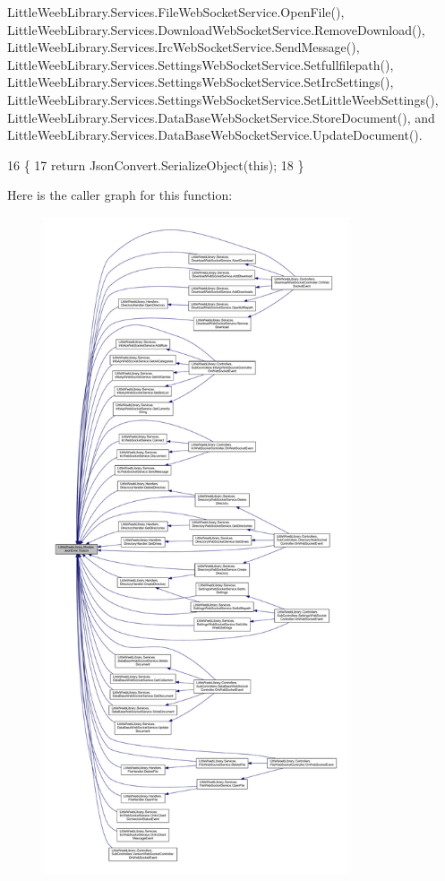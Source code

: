 Little\+Weeb\+Library.\+Services.\+File\+Web\+Socket\+Service.\+Open\+File(), Little\+Weeb\+Library.\+Services.\+Download\+Web\+Socket\+Service.\+Remove\+Download(), Little\+Weeb\+Library.\+Services.\+Irc\+Web\+Socket\+Service.\+Send\+Message(), Little\+Weeb\+Library.\+Services.\+Settings\+Web\+Socket\+Service.\+Setfullfilepath(), Little\+Weeb\+Library.\+Services.\+Settings\+Web\+Socket\+Service.\+Set\+Irc\+Settings(), Little\+Weeb\+Library.\+Services.\+Settings\+Web\+Socket\+Service.\+Set\+Little\+Weeb\+Settings(), Little\+Weeb\+Library.\+Services.\+Data\+Base\+Web\+Socket\+Service.\+Store\+Document(), and Little\+Weeb\+Library.\+Services.\+Data\+Base\+Web\+Socket\+Service.\+Update\+Document().


\begin{DoxyCode}
16         \{
17             \textcolor{keywordflow}{return} JsonConvert.SerializeObject(\textcolor{keyword}{this});
18         \}
\end{DoxyCode}
Here is the caller graph for this function\+:\nopagebreak
\begin{figure}[H]
\begin{center}
\leavevmode
\includegraphics[height=550pt]{class_little_weeb_library_1_1_models_1_1_json_error_a0e3e7dd2e2990404b7f0461742b23440_icgraph}
\end{center}
\end{figure}
